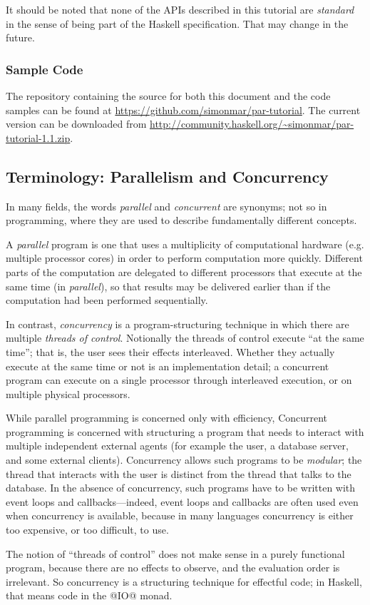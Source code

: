 \documentclass[11pt,a4paper]{article}
\newcommand{\Subsection}[2]{\subsection{#2}\label{sec:#1}}
\newcommand{\Subsubsection}[2]{\subsubsection{#2}\label{sec:#1}}
\newcommand{\version}{1.1}
\begin{document}
It should be noted that none of the APIs described in this tutorial
are \emph{standard} in the sense of being part of the Haskell
specification.  That may change in the future.

\Subsubsection{sample}{Sample Code}

The repository containing the source for both this document and the
code samples can be found at
\url{https://github.com/simonmar/par-tutorial}.  The current version
can be downloaded from
\url{http://community.haskell.org/~simonmar/par-tutorial-\version.zip}.

\Subsection{terminology}{Terminology: Parallelism and Concurrency}

In many fields, the words \emph{parallel} and \emph{concurrent} are
synonyms; not so in programming, where they are used to describe
fundamentally different concepts.

A \emph{parallel} program is one that uses a multiplicity of
computational hardware (e.g. multiple processor cores) in order to
perform computation more quickly.  Different parts of the computation
are delegated to different processors that execute at the same time
(in \emph{parallel}), so that results may be delivered earlier than if
the computation had been performed sequentially.

In contrast, \emph{concurrency} is a program-structuring technique in
which there are multiple \emph{threads of control}.  Notionally the
threads of control execute ``at the same time''; that is, the user
sees their effects interleaved.  Whether they actually execute at the
same time or not is an implementation detail; a concurrent program can
execute on a single processor through interleaved execution, or on
multiple physical processors.

While parallel programming is concerned only with efficiency,
Concurrent programming is concerned with structuring a program that
needs to interact with multiple independent external agents (for
example the user, a database server, and some external clients).
Concurrency allows such programs to be \emph{modular}; the thread that
interacts with the user is distinct from the thread that talks to the
database.  In the absence of concurrency, such programs have to be
written with event loops and callbacks---indeed, event loops and
callbacks are often used even when concurrency is available, because
in many languages concurrency is either too expensive, or too
difficult, to use.

The notion of ``threads of control'' does not make sense in a purely
functional program, because there are no effects to observe, and the
evaluation order is irrelevant.  So concurrency is a structuring
technique for effectful code; in Haskell, that means code in the @IO@
monad.
\end{document}
